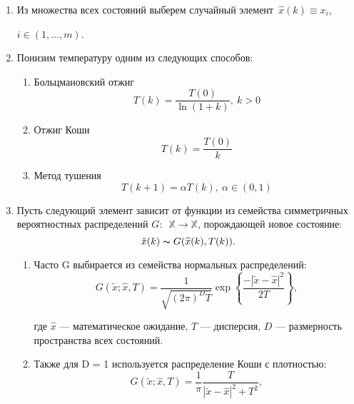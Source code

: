 \begin{enumerate}
	\item  Из множества всех состояний выберем случайный элемент~$\widehat{x}(k) \equiv x_i$, 
	
	$i \in (1, ..., m)$.
	
	\item Понизим температуру одним из следующих способов:
		
		\begin{enumerate}
			\item Больцмановский отжиг
			\begin{equation}
			T(k) =  \dfrac{T(0)}{\ln (1 + k)}, \ k > 0
			\label{eq:boltzman}
			\end{equation}
			
			\item Отжиг Коши
			\begin{equation}
			T(k)  =  \dfrac{T(0)}{k}
			\end{equation}
			
			\item Метод тушения
			\begin{equation}
			T(k+1) = \alpha T(k),\ \alpha \in (0, 1)
			\end{equation}
			
		\end{enumerate}
	
	
	\item Пусть следующий элемент зависит от функции из семейства симметричных вероятностных распределений $G:$~$ \mathbb{X} \to \mathbb{X}$, порождающей новое состояние:
	\[
	\tilde{x}(k) \thicksim G(\widehat{x}(k), T(k)).
	\]
	
	\begin{enumerate}
		
		\item Часто G выбирается из семейства нормальных распределений:
		\begin{equation}
		\label{eq:normal_G}
		G(\tilde{x}; \widehat{x}, T) 
		=
		\dfrac{1}
		{\sqrt{(2\pi)^{D} T}} 
		\exp
		\left\lbrace 
		\dfrac{- |\tilde{x} - \widehat{x}|^2}{2T}
		\right\rbrace, 
		\end{equation}
		
		где $\widehat{x}$ — математическое ожидание, $T$  — дисперсия, $D$ — размерность пространства всех состояний.
		
		\item Также для D = 1 используется распределение Коши с плотностью:
		\begin{equation}
		G(\tilde{x}; \widehat{x}, T) 
		=
		\dfrac{1}{\pi}
		\dfrac{T}{|\tilde{x}- \widehat{x}|^2 + T^2},
		\end{equation}
		

\end{enumerate}
\end{enumerate}

